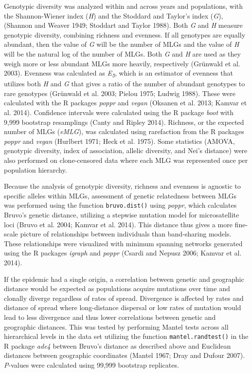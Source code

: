\documentclass[double,12pt]{beavtex}
\begin{document}
  Genotypic diversity was analyzed within and across years and
  populations, with the Shannon-Wiener index (\emph{H}) and the Stoddard
  and Taylor's index (\emph{G}), (Shannon and Weaver 1949; Stoddart and
  Taylor 1988). Both \emph{G} and \emph{H} measure genotypic diversity,
  combining richness and evenness. If all genotypes are equally abundant,
  then the value of \emph{G} will be the number of MLGs and the value of
  \emph{H} will be the natural log of the number of MLGs. Both \emph{G}
  and \emph{H} are used as they weigh more or less abundant MLGs more
  heavily, respectively (Grünwald et al. 2003). Evenness was calculated as
  \emph{E\textsubscript{5}}, which is an estimator of evenness that
  utilizes both \emph{H} and \emph{G} that gives a ratio of the number of
  abundant genotypes to rare genotypes (Grünwald et al. 2003; Pielou 1975;
  Ludwig 1988). These were calculated with the R packages \emph{poppr} and
  \emph{vegan} (Oksanen et al. 2013; Kamvar et al. 2014). Confidence
  intervals were calculated using the R package \emph{boot} with 9,999
  bootstrap resamplings (Canty and Ripley 2014). Richness, or the expected
  number of MLGs (\emph{eMLG}), was calculated using rarefaction from the
  R packages \emph{poppr} and \emph{vegan} (Hurlbert 1971; Heck et al.
  1975). Some statistics (AMOVA, genotypic diversity, index of
  association, allelic diversity, and Nei's distance) were also performed
  on clone-censored data where each MLG was represented once per
  population hierarchy.
  
  Because the analysis of genotypic diversity, richness and evenness is
  agnostic to specific alleles within MLGs, assessment of genetic
  relatedness between MLGs was performed using the function
  \texttt{bruvo.dist()} using \emph{poppr}, which calculates Bruvo's
  genetic distance, utilizing a stepwise mutation model for microsatellite
  loci (Bruvo et al. 2004; Kamvar et al. 2014). This distance thus gives a
  more fine-scale picture of relationships between individuals than
  band-sharing models. These relationships were visualized with minimum
  spanning networks generated using the R packages \emph{igraph} and
  \emph{poppr} (Csardi and Nepusz 2006; Kamvar et al. 2014).
  
  If the epidemic had a single origin, a correlation between genetic and
  geographic distance would be expected as populations acquire mutations
  over time and clonally diverge regardless of rates of spread. Divergence
  is affected by rates and distance of spread where long-distance
  dispersal or low rates of mutation would lead to less divergence and
  thus lower correlations between genetic and geographic distances. This
  was tested by performing Mantel tests across all hierarchical levels in
  the data set utilizing the function \texttt{mantel.randtest()} in the R
  package \emph{ade4} between Bruvo's distance as described above and
  Euclidean distances between geographic coordinates (Mantel 1967; Dray
  and Dufour 2007). \emph{P}-values were calculated using 99,999 bootstrap
  replicates.
  
\end{document}
